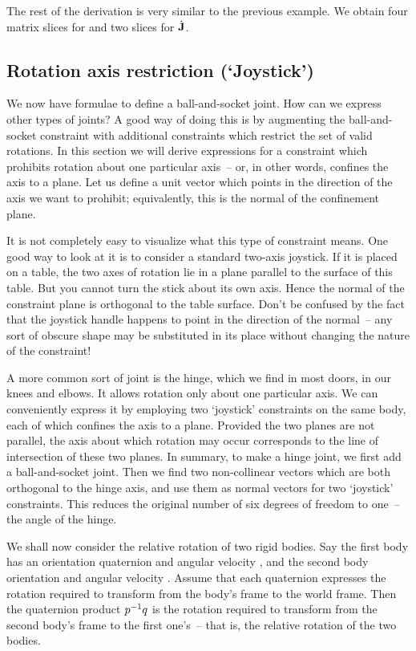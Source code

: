 The rest of the derivation is very similar to the previous example. We obtain four
matrix slices for  and two slices for $\dot{\m{J}}$.


\subsection{Rotation axis restriction (`Joystick')\label{constrJoystick}}

We now have formulae to define a ball-and-socket joint. How can we express other types
of joints? A good way of doing this is by augmenting the ball-and-socket constraint with
additional constraints which restrict the set of valid rotations. In this section we will
derive expressions for a constraint which prohibits rotation about one particular axis~--
or, in other words, confines the axis to a plane. Let us define a unit vector  which
points in the direction of the axis we want to prohibit; equivalently, this is the normal of
the confinement plane.

It is not completely easy to visualize what this type of constraint means. One good way to look
at it is to consider a standard two-axis joystick. If it is placed on a table, the two axes of
rotation lie in a plane parallel to the surface of this table. But you cannot turn the stick about
its own axis. Hence the normal of the constraint plane is orthogonal to the table surface.
Don't be confused by the fact that the joystick handle happens to point in the direction of the
normal~-- any sort of obscure shape may be substituted in its place without changing the nature
of the constraint!

A more common sort of joint is the hinge, which we find in most doors, in our knees and elbows.
It allows rotation only about one particular axis. We can conveniently express it by employing two
`joystick' constraints on the same body, each of which confines the axis to a plane. Provided the
two planes are not parallel, the axis about which rotation may occur corresponds to the line of
intersection of these two planes. In summary, to make a hinge joint, we first add a
ball-and-socket joint. Then we find two non-collinear vectors which are both orthogonal to the
hinge axis, and use them as normal vectors for two `joystick' constraints. This reduces the
original number of six degrees of freedom to one~-- the angle of the hinge.

We shall now consider the relative rotation of two rigid bodies. Say the first body has an
orientation quaternion  and angular velocity \ve{\phi}, and the second body orientation
 and angular velocity \ve{\omega}. Assume that each quaternion expresses the rotation
required to transform from the body's frame to the world frame. Then the quaternion product
$p^{-1}q$ is the rotation required to transform from the second body's frame to the first
one's~-- that is, the relative rotation of the two bodies.

